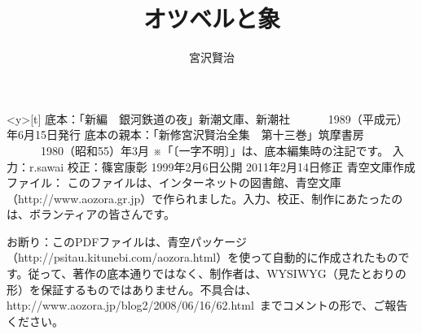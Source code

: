 
\title{オツベルと象}
\author{宮沢賢治}
\date{}

\maketitle


\theendnotes
\begin{teihon}
\clearpage\thispagestyle{empty}
\begin{minipage}<y>[t]{\textheight}
\vspace{0.5\baselineskip}
\scriptsize
底本：「新編　銀河鉄道の夜」新潮文庫、新潮社
　　　1989（平成元）年6月15日発行
底本の親本：「新修宮沢賢治全集　第十三巻」筑摩書房
　　　1980（昭和55）年3月
※「〔一字不明〕」は、底本編集時の注記です。
入力：r.sawai
校正：篠宮康彰
1999年2月6日公開
2011年2月14日修正
青空文庫作成ファイル：
このファイルは、インターネットの図書館、青空文庫（http://www.aozora.gr.jp）で作られました。入力、校正、制作にあたったのは、ボランティアの皆さんです。

\vspace{0.5\baselineskip}
お断り：このPDFファイルは、青空パッケージ（http://psitau.kitunebi.com/aozora.html）を使って自動的に作成されたものです。従って、著作の底本通りではなく、制作者は、WYSIWYG（見たとおりの形）を保証するものではありません。不具合は、http://www.aozora.jp/blog2/2008/06/16/62.html\ までコメントの形で、ご報告ください。


\end{minipage}
\end{teihon}

